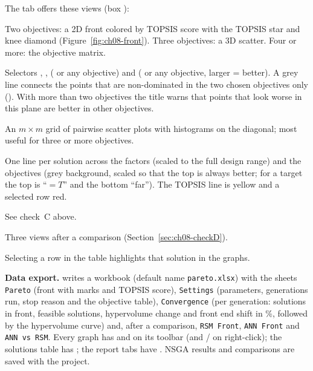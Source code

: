 The  tab offers these views (box ):
\begin{description}[style=nextline]
  \item[\ui{Pareto front (2D / 3D / matrix)}] Two objectives: a 2D front colored by TOPSIS score with the TOPSIS
        star and knee diamond (Figure~\ref{fig:ch08-front}). Three objectives: a 3D scatter. Four or more: the
        objective matrix.
  \item[\ui{Pareto 2D (choose axes)}] Selectors , ,  ( or any objective)
        and  ( or any objective, larger = better). A grey line connects the points that are
        non-dominated in the two chosen objectives only (). With more than two
        objectives the title warns that points that look worse in this plane are better in other objectives.
  \item[\ui{Objective matrix (each pair)}] An $m\times m$ grid of pairwise scatter plots with histograms on the
        diagonal; most useful for three or more objectives.
  \item[\ui{Parallel coordinates}] One line per solution across the factors (scaled to the full design range) and
        the objectives (grey background, scaled so that the top is always better; for a target the top is
        ``$=T$'' and the bottom ``far''). The TOPSIS line is yellow and a selected row red.
  \item[\ui{Convergence (hypervolume)}] See check~C above.
  \item[\ui{ANN vs RSM: \dots}] Three views after a comparison (Section~\ref{sec:ch08-checkD}).
\end{description}
Selecting a row in the table highlights that solution in the graphs.

\textbf{Data export.}  writes a workbook (default name \texttt{pareto.xlsx}) with the
sheets \texttt{Pareto} (front with marks and TOPSIS score), \texttt{Settings} (parameters, generations run, stop
reason and the objective table), \texttt{Convergence} (per generation: solutions in front, feasible solutions,
hypervolume change and front end shift in \%, followed by the hypervolume curve) and, after a comparison,
\texttt{RSM Front}, \texttt{ANN Front} and \texttt{ANN vs RSM}. Every graph has  and  on its toolbar (and  /  on right-click); the solutions table
has ; the report tabs have . NSGA results and comparisons are saved
with the project.

